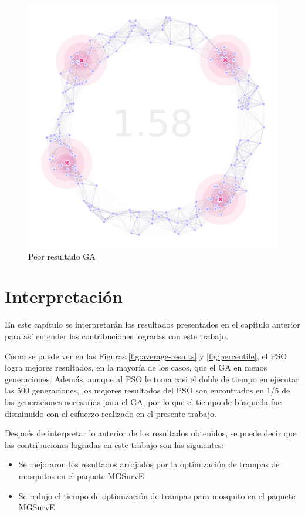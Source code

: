 \documentclass[letterpaper]{report}
\begin{document}
    \begin{figure}[ht!]
      \centering
      \includegraphics[width=\textwidth]{ga-worst.png}
      \caption{Peor resultado GA}
      \label{fig:ga-worst}
    \end{figure}

\chapter{Interpretación}\label{chap:interpretacion}
  En este capítulo se interpretarán los resultados presentados en el capítulo
  anterior para así entender las contribuciones logradas con este trabajo.

  Como se puede ver en las Figuras \ref{fig:average-results} y
  \ref{fig:percentile}, el PSO logra mejores resultados, en la mayoría de los
  casos, que el GA en menos generaciones. Además, aunque al PSO le toma casi el
  doble de tiempo en ejecutar las 500 generaciones, los mejores resultados del
  PSO son encontrados en 1/5 de las generaciones necesarias para el GA, por lo
  que el tiempo de búsqueda fue disminuido con el esfuerzo realizado en el
  presente trabajo.

  Después de interpretar lo anterior de los resultados obtenidos, se puede decir
  que las contribuciones logradas en este trabajo son las siguientes:

  \begin{itemize}
    \item Se mejoraron los resultados arrojados por la optimización de trampas
      de mosquitos en el paquete MGSurvE.
    \item Se redujo el tiempo de optimización de trampas para mosquito en el
      paquete MGSurvE.
  \end{itemize}
\end{document}
